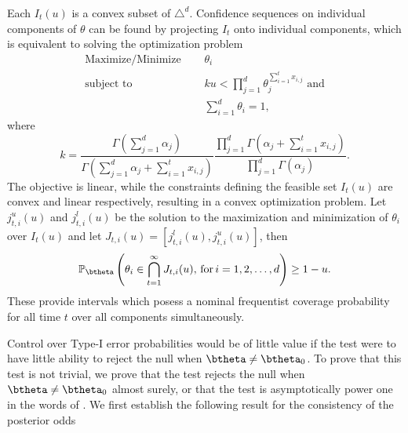\documentclass[11pt]{article}
\begin{document}
\noindent Each $I_t(u)$ is a convex subset of $\triangle^d$.
Confidence sequences on individual components of $\theta$ can be found by projecting $I_t$ onto individual components, which is equivalent to solving the optimization problem
\begin{align*}
  \text{Maximize/Minimize } & \quad \theta_i \\
  \text{subject to } & \quad ku < \prod_{j=1}^{d} \theta_{j}^{\sum_{i=1}^{t}x_{i,j}} \text{ and}\\
  &\quad \sum_{i=1}^{d}\theta_i = 1,
\end{align*}
where
\[
  k = \frac{\Gamma(\sum_{j=1}^{d} \alpha_j)}
  {\Gamma(\sum_{j=1}^{d} \alpha_j + \sum_{i=1}^{t}x_{i,j})}
  \frac{\prod_{j=1}^{d}\Gamma(\alpha_j + \sum_{i=1}^{t}x_{i,j} )}
  {\prod_{j=1}^{d}\Gamma(\alpha_j )}.
  \]
The objective is linear, while the constraints defining the feasible set $I_t(u)$ are convex and linear respectively, resulting in a convex optimization problem.
Let $j^{u}_{t,i}(u)$ and $j^{l}_{t,i}(u)$ be the solution to the maximization and minimization of $\theta_i$ over $I_t(u)$ and let $J_{t,i}(u)=[j^{l}_{t,i}(u), j^{u}_{t,i}(u)]$, then
\begin{equation}
  \label{eq:marginal_confidence_sequence}
  \mathbb{P}_{\btheta}\left( \theta_i \in \bigcap_{t=1}^{\infty} J_{t,i}(u),\, \text{for}\, i = 1,2, \dots, d \right) \geq 1- u.
\end{equation}
These provide intervals which posess a nominal frequentist coverage probability for all time $t$ over all components simultaneously.

Control over Type-I error probabilities would be of little value if the test were to have little ability to reject the null when $\btheta \neq \btheta_0$.
To prove that this test is not trivial, we prove that the test rejects the null when $\btheta \neq \btheta_0$ almost surely, or that the test is asymptotically power one in the words of \cite{robbins}.
We first establish the following result for the consistency of the posterior odds
\end{document}
